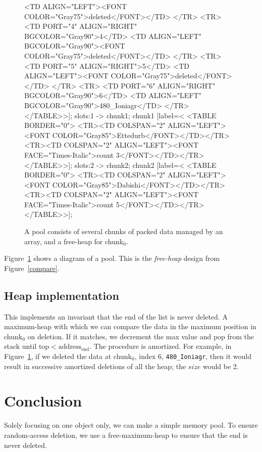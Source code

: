\documentclass[12pt]{article}
\newcommand{\code}[1]{\colorbox{light-gray}{\texttt{#1}}}
\begin{document}
\begin{figure}
{		<TD ALIGN="LEFT"><FONT COLOR="Gray75">deleted</FONT></TD>
	</TR>
	<TR>
		<TD PORT="4" ALIGN="RIGHT" BGCOLOR="Gray90">4</TD>
		<TD ALIGN="LEFT" BGCOLOR="Gray90"><FONT COLOR="Gray75">deleted</FONT></TD>
	</TR>
	<TR>
		<TD PORT="5" ALIGN="RIGHT">5</TD>
		<TD ALIGN="LEFT"><FONT COLOR="Gray75">deleted</FONT></TD>
	</TR>
	<TR>
		<TD PORT="6" ALIGN="RIGHT" BGCOLOR="Gray90">6</TD>
		<TD ALIGN="LEFT" BGCOLOR="Gray90">480_Ioniagr</TD>
	</TR>
</TABLE>>];
	slots:1 -> chunk1;
	chunk1 [label=<
<TABLE BORDER="0">
	<TR><TD COLSPAN="2" ALIGN="LEFT"><FONT COLOR="Gray85">Ettedurb</FONT></TD></TR>
	<TR><TD COLSPAN="2" ALIGN="LEFT"><FONT FACE="Times-Italic">count 3</FONT></TD></TR>
</TABLE>>];
	slots:2 -> chunk2;
	chunk2 [label=<
<TABLE BORDER="0">
	<TR><TD COLSPAN="2" ALIGN="LEFT"><FONT COLOR="Gray85">Dabishi</FONT></TD></TR>
	<TR><TD COLSPAN="2" ALIGN="LEFT"><FONT FACE="Times-Italic">count 5</FONT></TD></TR>
</TABLE>>];
	}
	\caption{A pool consists of several chunks of packed data managed by an array, and a free-heap for chunk$_0$.}
	\label{pool}
\end{figure}

Figure~\ref{pool} shows a diagram of a pool. This is the {\it free-heap} design from Figure~\ref{compare}.

\subsection{Heap implementation}

This implements an invariant that the end of the list is never deleted. A maximum-heap with which we can compare the data in the maximum position in chunk$_0$ on deletion. If it matches, we decrement the max value and pop from the stack until $\text{top} < \text{address}_\text{end}$. The procedure is amortized. For example, in Figure~\ref{pool}, if we deleted the data at chunk$_0$, index 6, \code{480\_Ioniagr}, then it would result in successive amortized deletions of all the heap; the $size$ would be 2.


\section{Conclusion}

Solely focusing on one object only, we can make a simple memory pool. To ensure random-access deletion, we use a free-maximum-heap to ensure that the end is never deleted.


\end{document}
